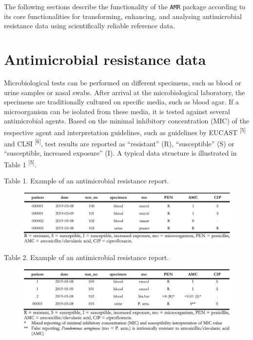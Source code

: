 \documentclass[
]{book}
\begin{document}
The following sections describe the functionality of the \texttt{AMR} package according to its core functionalities for transforming, enhancing, and analysing antimicrobial resistance data using scientifically reliable reference data.

\hypertarget{antimicrobial-resistance-data}{%
\section{Antimicrobial resistance data}\label{antimicrobial-resistance-data}}

Microbiological tests can be performed on different specimens, such as blood or urine samples or nasal swabs. After arrival at the microbiological laboratory, the specimens are traditionally cultured on specific media, such as blood agar. If a microorganism can be isolated from these media, it is tested against several antimicrobial agents. Based on the minimal inhibitory concentration (MIC) of the respective agent and interpretation guidelines, such as guidelines by EUCAST \textsuperscript{{[}5{]}} and CLSI \textsuperscript{{[}6{]}}, test results are reported as ``resistant'' (R), ``susceptible'' (S) or ``susceptible, increased exposure'' (I). A typical data structure is illustrated in Table 1 \textsuperscript{{[}5{]}}.

Table 1. Example of an antimicrobial resistance report.

\begin{figure}

{\centering \includegraphics[width=1\linewidth]{images/04-t01} 

}

\end{figure}

Table 2. Example of an antimicrobial resistance report.

\begin{figure}

{\centering \includegraphics[width=1\linewidth]{images/04-t02} 

}

\end{figure}
\end{document}
